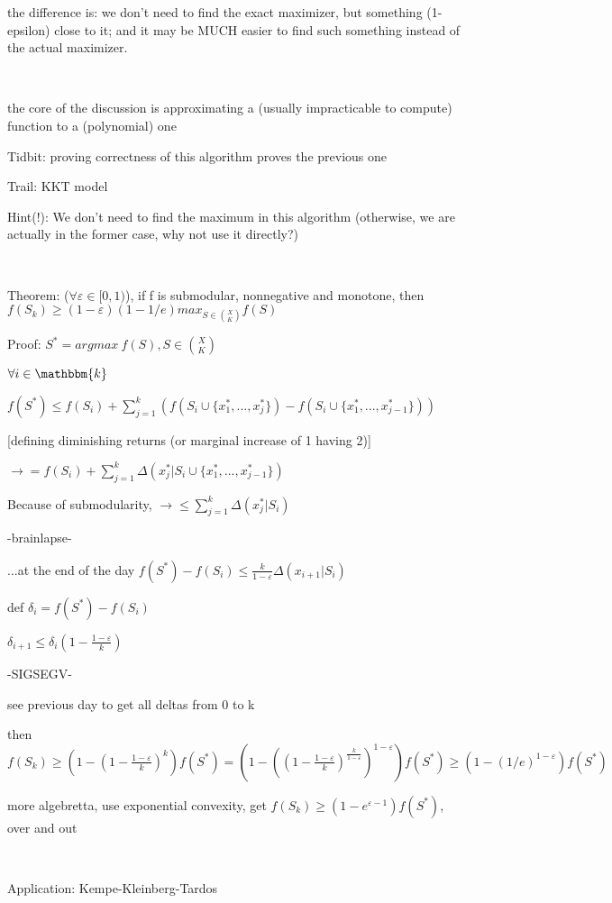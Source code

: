 \documentclass{report}
\begin{document}
	the difference is: we don't need to find the exact maximizer, but something (1-epsilon) close to it; and it may be MUCH easier to find such something instead of the actual maximizer.
	
	\
	
	the core of the discussion is approximating a (usually impracticable to compute) function to a (polynomial) one
	
	Tidbit: proving correctness of this algorithm proves the previous one
	
	Trail: KKT model
	
	Hint(!): We don't need to find the maximum in this algorithm (otherwise, we are actually in the former case, why not use it directly?)
	
	\
	
	Theorem: ($\forall \varepsilon \in [0, 1)$), if f is submodular, nonnegative and monotone, then $f(S_k) \geq (1-\varepsilon)(1-1/e)max_{S \in \binom{X}{K}}f(S)$

	Proof: $S^* = argmax\ f(S), S \in \binom{X}{K}$
	
	$\forall i \in \mathbbm{k}$
	
	$f(S^*) \leq f(S_i) + \sum_{j=1}^{k}(f(S_i \cup\{x_1^*, ..., x_j^*\})-f(S_i \cup\{x_1^*, ..., x_{j-1}^*\}))$
	
	[defining diminishing returns (or marginal increase of {1} having {2})]
	
	$\to = f(S_i)+ \sum_{j=1}^{k}\Delta(x_j^* | S_i \cup \{x_1^*, ..., x_{j-1}^*\})$
	
	Because of submodularity, $\to \leq \sum_{j=1}^{k}\Delta(x_j^* | S_i)$
	
	-brainlapse-
	
	...at the end of the day $f(S^*) - f (S_i) \leq \frac{k}{1-\varepsilon}\Delta(x_{i+1}| S_i)$
	
	def $\delta_i = f(S^*) - f(S_i)$
	
	$\delta_{i+1} \leq \delta_i(1-\frac{1-\varepsilon}{k})$
	
	-SIGSEGV-
	
	see previous day to get all deltas from 0 to k
	
	then $f(S_k) \geq (1-(1-\frac{1-\varepsilon}{k})^k)f(S^*)=(1-((1-\frac{1-\varepsilon}{k})^{\frac{k}{1-\varepsilon}})^{1-\varepsilon})f(S^*) \geq (1-(1/e)^{1-\varepsilon})f(S^*)$
	
	more algebretta, use exponential convexity, get $f(S_k) \geq (1-e^{\varepsilon-1})f(S^*)$, over and out
	
	\
	
	Application: Kempe-Kleinberg-Tardos
	
	
\end{document}
